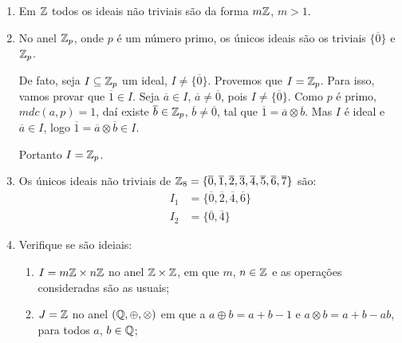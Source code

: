 \begin{exemplo}
    \begin{enumerate}[label={\arabic*})]
        \item Em $\mathbb{Z}$ todos os ideais não triviais são da forma $m\mathbb{Z}$, $m > 1$.
        \item No anel $\mathbb{Z}_p$, onde $p$ é um n{ú}mero primo, os {ú}nicos ideais  são os triviais $\{\overline{0}\}$ e $\mathbb{Z}_p$.
        \begin{solucao}
            De fato, seja $I \subseteq \mathbb{Z}_p$ um ideal, $I \neq \{\overline{0}\}$. Provemos que $I = \mathbb{Z}_p$. Para isso, vamos provar que $\overline{1} \in I$. Seja $\overline{a} \in I$,
            $\overline{a} \neq \overline{0}$, pois $I \neq \{\overline{0}\}$. Como $p$ é primo, $mdc(a,p) = 1$, daí existe $\overline{b} \in \mathbb{Z}_p$, $\overline{b} \neq
            \overline{0}$, tal que $\overline{1} = \overline{a} \otimes \overline{b}$. Mas $I$ é ideal e $\overline{a} \in I$, logo $\overline{1} = \overline{a} \otimes
            \overline{b} \in I$.

            Portanto $I = \mathbb{Z}_p$.
        \end{solucao}

        \item Os {ú}nicos ideais não triviais de $\mathbb{Z}_8 = \{\overline{0}, \overline{1}, \overline{2}, \overline{3}, \overline{4}, \overline{5}, \overline{6}, \overline{7}\}$
            são:
        \begin{align*}
            I_1 &= \{\overline{0}, \overline{2}, \overline{4}, \overline{6}\}\\
            I_2 &=\{\overline{0}, \overline{4}\}
        \end{align*}

        \item Verifique se são ideiais:
            \begin{enumerate}[label=({\alph*})]
                \item $I = m\mathbb{Z} \times n\mathbb{Z}$ no anel $\mathbb{Z} \times \mathbb{Z}$, em que $m$, $n \in \mathbb{Z}$ e as operações consideradas são as usuais;

                \item $J = \mathbb{Z}$ no anel $(\mathbb{Q}, \oplus, \otimes)$ em que a $a \oplus b = a + b - 1$ e $a \otimes b = a + b - ab$, para todos $a$, $b \in \mathbb{Q}$;


\end{enumerate}
\end{enumerate}
\end{exemplo}
